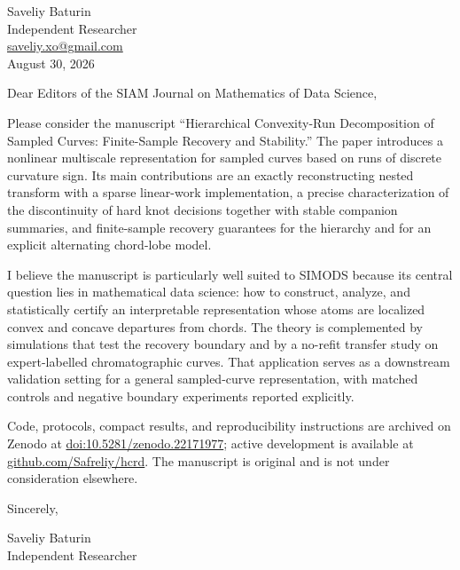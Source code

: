 \documentclass[11pt]{article}
\begin{document}
\begin{flushright}
Saveliy Baturin\\
Independent Researcher\\
\href{mailto:saveliy.xo@gmail.com}{saveliy.xo@gmail.com}\\
August 30, 2026
\end{flushright}

Dear Editors of the SIAM Journal on Mathematics of Data Science,

Please consider the manuscript ``Hierarchical Convexity-Run Decomposition of
Sampled Curves: Finite-Sample Recovery and Stability.'' The paper introduces a
nonlinear multiscale representation for sampled curves based on runs of discrete
curvature sign. Its main contributions are an exactly reconstructing nested
transform with a sparse linear-work implementation, a precise characterization
of the discontinuity of hard knot decisions together with stable companion
summaries, and finite-sample recovery guarantees for the hierarchy and for an
explicit alternating chord-lobe model.

I believe the manuscript is particularly well suited to SIMODS because its
central question lies in mathematical data science: how to construct, analyze,
and statistically certify an interpretable representation whose atoms are
localized convex and concave departures from chords. The theory is complemented
by simulations that test the recovery boundary and by a no-refit transfer study
on expert-labelled chromatographic curves. That application serves as a
downstream validation setting for a general sampled-curve representation, with
matched controls and negative boundary experiments reported explicitly.

Code, protocols, compact results, and reproducibility instructions are archived
on Zenodo at
\href{https://doi.org/10.5281/zenodo.22171977}{doi:10.5281/zenodo.22171977};
active development is available at
\href{https://github.com/Safreliy/hcrd}{github.com/Safreliy/hcrd}. The manuscript
is original and is not under consideration elsewhere.

Sincerely,

Saveliy Baturin\\
Independent Researcher
\end{document}
